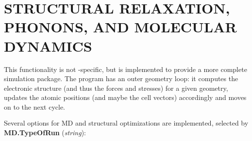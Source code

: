 \vspace{5pt}
\section{STRUCTURAL RELAXATION, PHONONS, AND MOLECULAR DYNAMICS}

This functionality is not \siesta-specific, but is implemented to
provide a more complete simulation package. The program has an outer
geometry loop: it computes the electronic structure (and
thus the forces and stresses) for a given geometry, updates the
atomic positions (and maybe the cell vectors) accordingly and moves on
to the next cycle.

Several options for MD and structural optimizations are
implemented, selected by
\textbf{MD.TypeOfRun} (\textit{string}):

